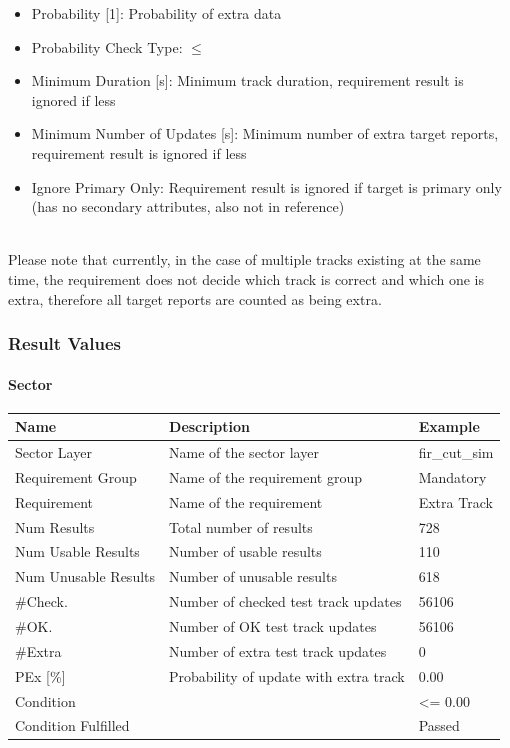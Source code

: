\begin{itemize}  
\item Probability [1]: Probability of extra data
\item Probability Check Type: $\leq$
\item Minimum Duration [s]: Minimum track duration, requirement result is ignored if less
\item Minimum Number of Updates [s]: Minimum number of extra target reports, requirement result is ignored if less
\item Ignore Primary Only: Requirement result is ignored if target is primary only (has no secondary attributes, also not in reference)
\end{itemize}
\ \\

Please note that currently, in the case of multiple tracks existing at the same time, the requirement does not decide which track is correct and which one is extra, therefore all target reports are counted as being extra. \\

\subsubsection{Result Values}

\paragraph{Sector}

\begin{center}
 \begin{table}[H]
  \begin{tabularx}{\textwidth}{ | l | X |  l | }
    \hline
    \textbf{Name} & \textbf{Description} & \textbf{Example} \\ \hline
    Sector Layer & Name of the sector layer & fir\_cut\_sim \\ \hline
    Requirement Group & Name of the requirement group & Mandatory \\ \hline
    Requirement & Name of the requirement & Extra Track \\ \hline
    Num Results & Total number of results & 728 \\ \hline
    Num Usable Results & Number of usable results & 110 \\ \hline
    Num Unusable Results & Number of unusable results & 618 \\ \hline
    \#Check. & Number of checked test track updates & 56106 \\ \hline
    \#OK. & Number of OK test track updates & 56106 \\ \hline
    \#Extra & Number of extra test track updates & 0 \\ \hline
    PEx [\%] & Probability of update with extra track & 0.00 \\ \hline
    Condition &  & <= 0.00 \\ \hline
    Condition Fulfilled &  & Passed \\ \hline
\end{tabularx}
\end{table}
\end{center}

